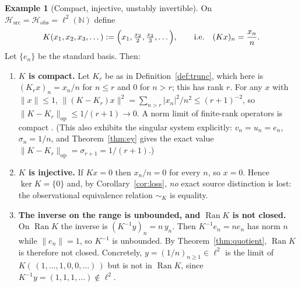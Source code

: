 \documentclass[11pt,reqno]{amsart}
\numberwithin{equation}{section}
\theoremstyle{plain}
\theoremstyle{definition}
\newtheorem{example}[theorem]{Example}
\theoremstyle{remark}
\newcommand{\Hsrc}{\mathcal{H}_{\mathrm{src}}}
\newcommand{\Hobs}{\mathcal{H}_{\mathrm{obs}}}
\newcommand{\Ran}{\operatorname{Ran}}
\begin{document}
\begin{example}[Compact, injective, unstably invertible]
\label{ex:diagonal}
On $\Hsrc=\Hobs=\ell^{2}(\mathbb{N})$ define
\begin{equation}
\label{eq:diagop}
K(x_{1},x_{2},x_{3},\dots)
:=\Bigl(x_{1},\tfrac{x_{2}}{2},\tfrac{x_{3}}{3},\dots\Bigr),
\qquad\text{i.e.}\quad
(Kx)_{n}=\frac{x_{n}}{n}.
\end{equation}
Let $\{e_{n}\}$ be the standard basis. Then:
\begin{enumerate}
\item \textbf{$K$ is compact.} Let $K_{r}$ be as in Definition~\ref{def:trunc}, which here is
$(K_{r}x)_{n}=x_{n}/n$ for $n\le r$ and $0$ for $n>r$; this has rank $r$. For any
$x$ with $\lVert x\rVert\le1$,
$\lVert(K-K_{r})x\rVert^{2}=\sum_{n>r}\lvert x_{n}\rvert^{2}/n^{2}\le(r+1)^{-2}$, so
$\lVert K-K_{r}\rVert_{\mathrm{op}}\le1/(r+1)\to0$. A norm limit of finite-rank operators is
compact \cite[Thm.~VI.12]{ReedSimon1}. (This also exhibits the singular system explicitly:
$v_{n}=u_{n}=e_{n}$, $\sigma_{n}=1/n$, and Theorem~\ref{thm:ey} gives the exact value
$\lVert K-K_{r}\rVert_{\mathrm{op}}=\sigma_{r+1}=1/(r+1)$.)
\item \textbf{$K$ is injective.} If $Kx=0$ then $x_{n}/n=0$ for every $n$, so $x=0$. Hence
$\ker K=\{0\}$ and, by Corollary~\ref{cor:loss}, \emph{no} exact source distinction is lost:
the observational equivalence relation $\sim_{K}$ is equality.
\item \textbf{The inverse on the range is unbounded, and $\Ran K$ is not closed.} On
$\Ran K$ the inverse is $(K^{-1}y)_{n}=n\,y_{n}$. Then $K^{-1}e_{n}=n e_{n}$ has norm $n$
while $\lVert e_{n}\rVert=1$, so $K^{-1}$ is unbounded. By Theorem~\ref{thm:quotient},
$\Ran K$ is therefore not closed. Concretely, $y=(1/n)_{n\ge1}\in\ell^{2}$ is the limit of
$K(\,(1,\dots,1,0,0,\dots)\,)$ but is not in $\Ran K$, since $K^{-1}y=(1,1,1,\dots)\notin\ell^{2}$.
\end{enumerate}
\end{example}
\end{document}
